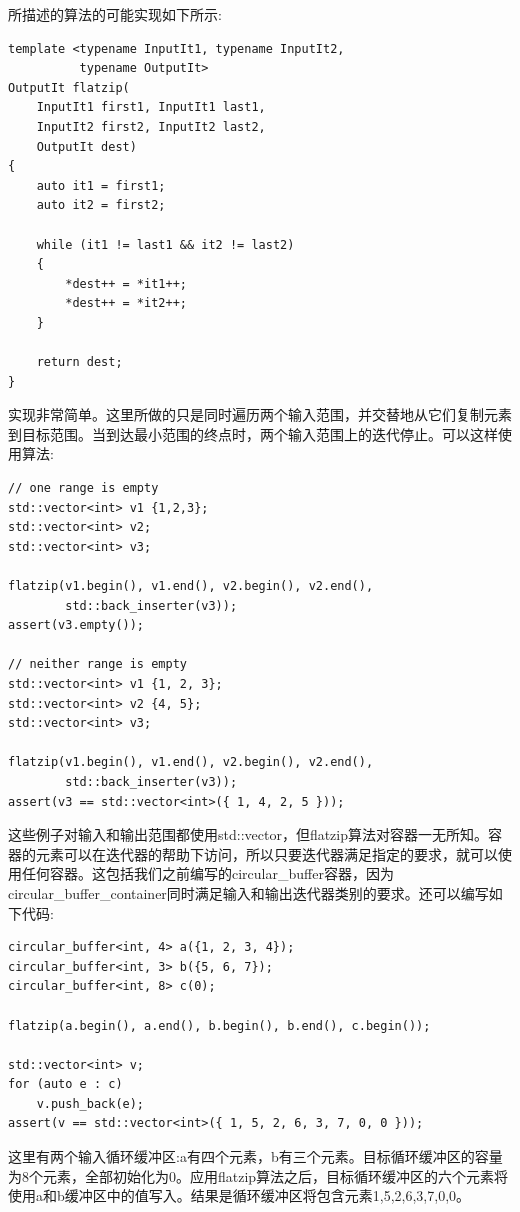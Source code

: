 所描述的算法的可能实现如下所示:

\begin{lstlisting}[style=styleCXX]
template <typename InputIt1, typename InputIt2,
		  typename OutputIt>
OutputIt flatzip(
	InputIt1 first1, InputIt1 last1,
	InputIt2 first2, InputIt2 last2,
	OutputIt dest)
{
	auto it1 = first1;
	auto it2 = first2;
	
	while (it1 != last1 && it2 != last2)
	{
		*dest++ = *it1++;
		*dest++ = *it2++;
	}

	return dest;
}
\end{lstlisting}

实现非常简单。这里所做的只是同时遍历两个输入范围，并交替地从它们复制元素到目标范围。当到达最小范围的终点时，两个输入范围上的迭代停止。可以这样使用算法:

\begin{lstlisting}[style=styleCXX]
// one range is empty
std::vector<int> v1 {1,2,3};
std::vector<int> v2;
std::vector<int> v3;

flatzip(v1.begin(), v1.end(), v2.begin(), v2.end(),
		std::back_inserter(v3));
assert(v3.empty());

// neither range is empty
std::vector<int> v1 {1, 2, 3};
std::vector<int> v2 {4, 5};
std::vector<int> v3;

flatzip(v1.begin(), v1.end(), v2.begin(), v2.end(),
		std::back_inserter(v3));
assert(v3 == std::vector<int>({ 1, 4, 2, 5 }));
\end{lstlisting}

这些例子对输入和输出范围都使用std::vector，但flatzip算法对容器一无所知。容器的元素可以在迭代器的帮助下访问，所以只要迭代器满足指定的要求，就可以使用任何容器。这包括我们之前编写的circular\_buffer容器，因为circular\_buffer\_container同时满足输入和输出迭代器类别的要求。还可以编写如下代码:

\begin{lstlisting}[style=styleCXX]
circular_buffer<int, 4> a({1, 2, 3, 4});
circular_buffer<int, 3> b({5, 6, 7});
circular_buffer<int, 8> c(0);

flatzip(a.begin(), a.end(), b.begin(), b.end(), c.begin());

std::vector<int> v;
for (auto e : c)
	v.push_back(e);
assert(v == std::vector<int>({ 1, 5, 2, 6, 3, 7, 0, 0 }));
\end{lstlisting}

这里有两个输入循环缓冲区:a有四个元素，b有三个元素。目标循环缓冲区的容量为8个元素，全部初始化为0。应用flatzip算法之后，目标循环缓冲区的六个元素将使用a和b缓冲区中的值写入。结果是循环缓冲区将包含元素1,5,2,6,3,7,0,0。













